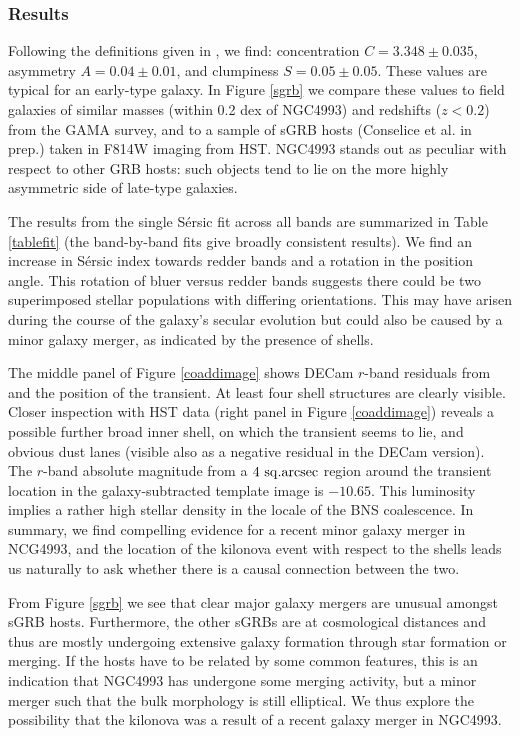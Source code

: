 \subsubsection{Results}
\label{morphresults}
Following the definitions given in \citet{conselice}, we find: concentration $C=3.348\pm 0.035$, asymmetry $A=0.04\pm 0.01$, and clumpiness $S=0.05\pm 0.05$. These values are typical for an early-type galaxy. In Figure \ref{sgrb} we compare these values to field galaxies of similar masses (within 0.2 dex of NGC4993) and redshifts ($z<0.2$) from the GAMA survey, and to a sample of sGRB hosts (Conselice et al. in prep.) taken in F814W imaging from HST. NGC4993 stands out as peculiar with respect to other GRB hosts: such objects tend to lie on the more highly asymmetric side of late-type galaxies.

The results from the single S\'ersic fit across all bands are summarized in Table \ref{tablefit} (the band-by-band fits give broadly consistent results). We find an increase in S\'ersic index towards redder bands and a rotation in the position angle. 
This rotation of bluer versus redder bands suggests there could be two superimposed stellar populations with differing orientations. This may have arisen during the course of the galaxy's secular evolution but could also be caused by a minor galaxy merger, as indicated by the presence of shells.

The middle panel of Figure \ref{coaddimage} shows DECam $r$-band residuals from \galfit and the position of the transient. At least four shell structures are clearly visible. Closer inspection with HST data (right panel in Figure \ref{coaddimage}) reveals a possible further broad inner shell, on which the transient seems to lie, and obvious dust lanes (visible also as a negative residual in the DECam version).  The $r$-band absolute magnitude from a $4~{\rm sq.arcsec}$ region around the transient location in the galaxy-subtracted template image is $-10.65$. This luminosity implies a rather high stellar density in the locale of the BNS coalescence. In summary, we find compelling evidence for a recent minor galaxy merger in NCG4993, and the location of the kilonova event with respect to the shells leads us naturally to ask whether there is a causal connection between the two.  

From Figure \ref{sgrb} we see that clear major galaxy mergers are unusual amongst sGRB hosts. Furthermore, the other sGRBs are at cosmological distances and thus are mostly undergoing extensive galaxy formation through star formation or merging.  If the hosts have to be related by some common features, this is an indication that NGC4993 has undergone some merging activity, but a minor merger such that the bulk morphology is still elliptical. We thus explore the possibility that the kilonova was a result of a recent galaxy merger in NGC4993.

